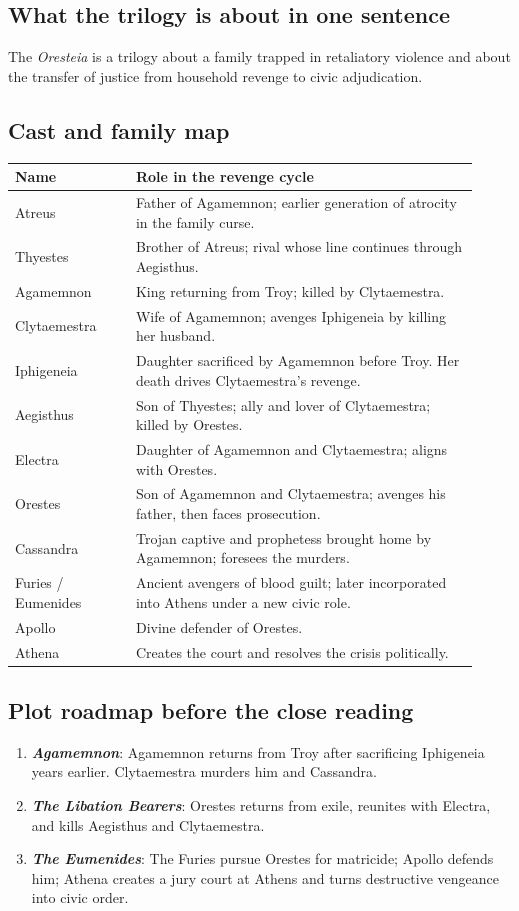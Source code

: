 \documentclass[11pt]{article}
\begin{document}
\subsection*{What the trilogy is about in one sentence}
The \textit{Oresteia} is a trilogy about a family trapped in retaliatory violence and about the transfer of justice from household revenge to civic adjudication.

\subsection*{Cast and family map}
\begin{tabular}{@{}p{0.24\linewidth}p{0.68\linewidth}@{}}
\toprule
\textbf{Name} & \textbf{Role in the revenge cycle} \\
\midrule
Atreus & Father of Agamemnon; earlier generation of atrocity in the family curse. \\
Thyestes & Brother of Atreus; rival whose line continues through Aegisthus. \\
Agamemnon & King returning from Troy; killed by Clytaemestra. \\
Clytaemestra & Wife of Agamemnon; avenges Iphigeneia by killing her husband. \\
Iphigeneia & Daughter sacrificed by Agamemnon before Troy. Her death drives Clytaemestra's revenge. \\
Aegisthus & Son of Thyestes; ally and lover of Clytaemestra; killed by Orestes. \\
Electra & Daughter of Agamemnon and Clytaemestra; aligns with Orestes. \\
Orestes & Son of Agamemnon and Clytaemestra; avenges his father, then faces prosecution. \\
Cassandra & Trojan captive and prophetess brought home by Agamemnon; foresees the murders. \\
Furies / Eumenides & Ancient avengers of blood guilt; later incorporated into Athens under a new civic role. \\
Apollo & Divine defender of Orestes. \\
Athena & Creates the court and resolves the crisis politically. \\
\bottomrule
\end{tabular}

\subsection*{Plot roadmap before the close reading}
\begin{enumerate}
\item \textbf{\textit{Agamemnon}}: Agamemnon returns from Troy after sacrificing Iphigeneia years earlier. Clytaemestra murders him and Cassandra.
\item \textbf{\textit{The Libation Bearers}}: Orestes returns from exile, reunites with Electra, and kills Aegisthus and Clytaemestra.
\item \textbf{\textit{The Eumenides}}: The Furies pursue Orestes for matricide; Apollo defends him; Athena creates a jury court at Athens and turns destructive vengeance into civic order.
\end{enumerate}
\end{document}
